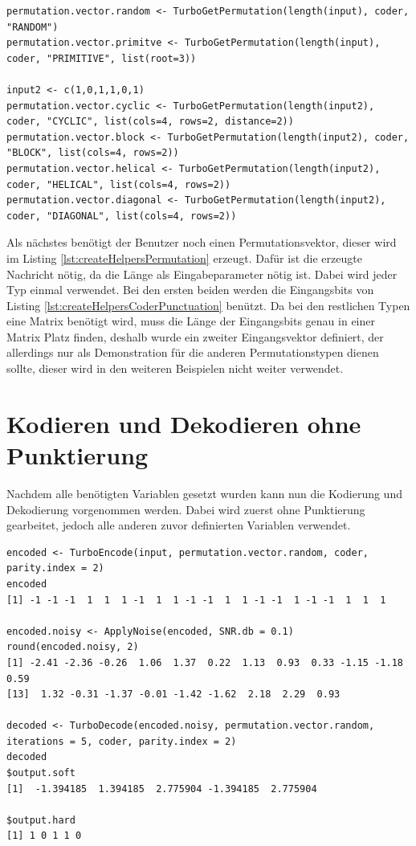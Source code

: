 \begin{lstlisting}[caption=Erzeugung von verschiedenen Permutationsvektoren, label={lst:createHelpersPermutation}, float=!ht]
permutation.vector.random <- TurboGetPermutation(length(input), coder, "RANDOM")
permutation.vector.primitve <- TurboGetPermutation(length(input), coder, "PRIMITIVE", list(root=3))

input2 <- c(1,0,1,1,0,1)
permutation.vector.cyclic <- TurboGetPermutation(length(input2), coder, "CYCLIC", list(cols=4, rows=2, distance=2))
permutation.vector.block <- TurboGetPermutation(length(input2), coder, "BLOCK", list(cols=4, rows=2))
permutation.vector.helical <- TurboGetPermutation(length(input2), coder, "HELICAL", list(cols=4, rows=2))
permutation.vector.diagonal <- TurboGetPermutation(length(input2), coder, "DIAGONAL", list(cols=4, rows=2))
\end{lstlisting}

Als nächstes benötigt der Benutzer noch einen Permutationsvektor, dieser wird im Listing \ref{lst:createHelpersPermutation} erzeugt. Dafür ist die erzeugte Nachricht nötig, da die Länge als Eingabeparameter nötig ist. Dabei wird jeder Typ einmal verwendet. Bei den ersten beiden werden die Eingangsbits von Listing \ref{lst:createHelpersCoderPunctuation} benützt. Da bei den restlichen Typen eine Matrix benötigt wird, muss die Länge der Eingangsbits genau in einer Matrix Platz finden, deshalb wurde ein zweiter Eingangsvektor definiert, der allerdings nur als Demonstration für die anderen Permutationstypen dienen sollte, dieser wird in den weiteren Beispielen nicht weiter verwendet.

\section{Kodieren und Dekodieren ohne Punktierung}
\label{sec:example_withoutPunctuation}
Nachdem alle benötigten Variablen gesetzt wurden kann nun die Kodierung und Dekodierung vorgenommen werden. Dabei wird zuerst ohne Punktierung gearbeitet, jedoch alle anderen zuvor definierten Variablen verwendet.

\begin{lstlisting}[caption=Kodierung und Dekodierung ohne Punktierung, label={lst:encodeDecodeWithoutPunctuation}, float=!ht]
encoded <- TurboEncode(input, permutation.vector.random, coder, parity.index = 2)
encoded
[1] -1 -1 -1  1  1  1 -1  1  1 -1 -1  1  1 -1 -1  1 -1 -1  1  1  1

encoded.noisy <- ApplyNoise(encoded, SNR.db = 0.1)
round(encoded.noisy, 2)
[1] -2.41 -2.36 -0.26  1.06  1.37  0.22  1.13  0.93  0.33 -1.15 -1.18  0.59
[13]  1.32 -0.31 -1.37 -0.01 -1.42 -1.62  2.18  2.29  0.93

decoded <- TurboDecode(encoded.noisy, permutation.vector.random, iterations = 5, coder, parity.index = 2)
decoded
$output.soft
[1]  -1.394185  1.394185  2.775904 -1.394185  2.775904

$output.hard
[1] 1 0 1 1 0
\end{lstlisting}

